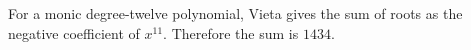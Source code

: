 For a monic degree-twelve polynomial, Vieta gives the sum of roots as the negative coefficient of $x^{11}$. Therefore the sum is $\boxed{1434}$.
